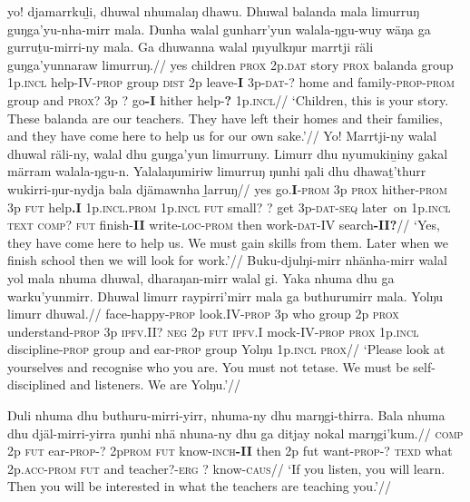 \documentclass[10pt]{article}
\begin{document}
\pex[glftpos=right]\a\begingl\gla yo! djamarrkuḻi, dhuwal nhumalaŋ dhawu. Dhuwal balanda mala limurruŋ guŋga'yu-nha-mirr mala. Ŋunha walal gunharr'yun walala-ŋgu-wuy wäŋa ga gurruṯu-mirri-ny mala. Ga dhuwanna walal ŋuyulkŋur marrtji räli guŋga'yunnaraw limurruŋ.//
\glb yes children \textsc{prox} 2p\textsc{.dat} story \textsc{prox} balanda group 1p\textsc{.incl} help-IV-\textsc{prop} group \textsc{dist} 2p leave-\textbf{I} 3p\textsc{-dat-?} home and family\textsc{-prop-prom} group and \textsc{prox?} 3p ? go\textbf{-I} hither help-\textbf{?} 1p.\textsc{incl}//
\glft `Children, this is your story. These balanda are our teachers. They have left their homes and their families, and they have come here to help us for our own sake.'//\endgl
\a\begingl\gla Yo! Marrtji-ny walal dhuwal räli-ny, walal dhu guŋga'yun limurruny. Limurr dhu nyumukiṉiny gakal märram walala-ŋgu-n. Yalalaŋumiriw limurruŋ ŋunhi ŋali dhu dhawaṯ'thurr wukirri-ŋur-nydja bala djämawnha ḻarruŋ//
\glb yes go.\textbf{I}\textsc{-prom} 3p \textsc{prox} hither-\textsc{prom} 3p \textsc{fut} help\textbf{.I} 1p.\textsc{incl.prom} 1p.\textsc{incl} \textsc{fut} small? ? get 3p-\textsc{dat-seq} later~on 1p\textsc{.incl} \textsc{text} \textsc{comp?} \textsc{fut} finish-\textbf{II}  write\textsc{-loc-prom} then work-\textsc{dat-IV} search\textbf{-II?}//
\glft`Yes, they have come here to help us. We must gain skills from them. Later when we finish school then we will look for work.'//\endgl
\a\begingl\gla Buku-djulŋi-mirr nhänha-mirr walal yol mala nhuma dhuwal, dharaŋan-mirr walal gi. Yaka nhuma dhu ga warku'yunmirr. Dhuwal limurr raypirri'mirr mala ga buthurumirr mala. Yolŋu limurr dhuwal.//
\glb face-happy-\textsc{prop} look.IV-\textsc{prop} 3p who group 2p \textsc{prox} understand-\textsc{prop} 3p \textsc{ipfv.II?} \textsc{neg} 2p \textsc{fut} \textsc{ipfv.I} mock-IV\textsc{-prop} \textsc{prox} 1p\textsc{.incl} discipline\textsc{-prop} group and ear\textsc{-prop} group Yolŋu 1p\textsc{.incl} \textsc{prox}//
\glft`Please look at yourselves and recognise who you are. You must not tetase. We must be self-disciplined and listeners. We are Yolŋu.'//\endgl

\a\begingl\gla Ŋuli nhuma dhu buthuru-mirri-yirr, nhuma-ny dhu marŋgi-thirra. Bala nhuma dhu djäl-mirri-yirra ŋunhi nhä nhuna-ny dhu ga ditjay nokal marŋgi'kum.//
\glb \textsc{comp} 2p \textsc{fut} ear-\textsc{prop-?} 2p\textsc{prom} \textsc{fut} know\textsc{-inch\textbf{-II}} then 2p fut want\textsc{-prop-?} \textsc{texd} what 2p\textsc{.acc-prom} \textsc{fut} and teacher?\textsc{-erg} ? know\textsc{-caus}//
\glft`If you listen, you will learn. Then you will be interested in what the teachers are teaching you.'//\endgl
\end{document}
